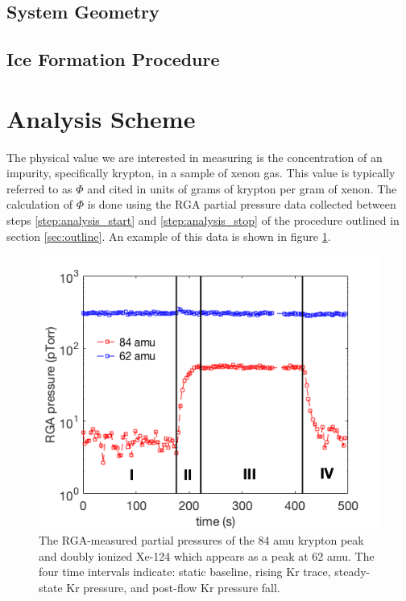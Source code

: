 \documentclass[12pt]{article}
\begin{document}
\subsection{System Geometry}
\label{sec:geometry}

\subsection{Ice Formation Procedure}



\section{Analysis Scheme}
The physical value we are interested in measuring is the concentration of an impurity, specifically krypton, in a sample of xenon gas. This value is typically referred to as $\Phi$ and cited in units of grams of krypton per gram of xenon. The calculation of $\Phi$ is done using the RGA partial pressure data collected between steps \ref{step:analysis_start} and \ref{step:analysis_stop} of the procedure outlined in section \ref{sec:outline}. An example of this data is shown in figure \ref{fig:RGAtrace}. 

\begin{figure}[h!]
  \includegraphics[width=\linewidth]{Figures/RGA_trace.png}
  \caption{The RGA-measured partial pressures of the 84 amu krypton peak and doubly ionized Xe-124 which appears as a peak at 62 amu. The four time intervals indicate: static baseline, rising Kr trace, steady-state Kr pressure, and post-flow Kr pressure fall.}
  \label{fig:RGAtrace}
\end{figure}
\end{document}
